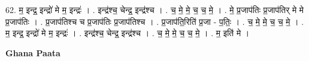 \documentclass[17pt]{extarticle}
\begin{document}
62. म॒ इन्द्र॒ इन्द्रो॑ मे म॒ इन्द्रः॑ । . इन्द्र॑श्च॒ चेन्द्र॒ इन्द्र॑श्च । . च॒ मे॒ मे॒ च॒ च॒ मे॒ । . मे॒ प्र॒जाप॑तिः प्र॒जाप॑तिर् मे मे प्र॒जाप॑तिः । . प्र॒जाप॑तिश्च च प्र॒जाप॑तिः प्र॒जाप॑तिश्च । . प्र॒जाप॑ति॒रिति॑ प्र॒जा - प॒तिः॒ । . च॒ मे॒ मे॒ च॒ च॒ मे॒ । . म॒ इन्द्र॒ इन्द्रो॑ मे म॒ इन्द्रः॑ । . इन्द्र॑श्च॒ चेन्द्र॒ इन्द्र॑श्च । . च॒ मे॒ मे॒ च॒ च॒ मे॒ । . म॒ इति॑ मे । \newline

\textbf{Ghana Paata } \newline
\end{document}
